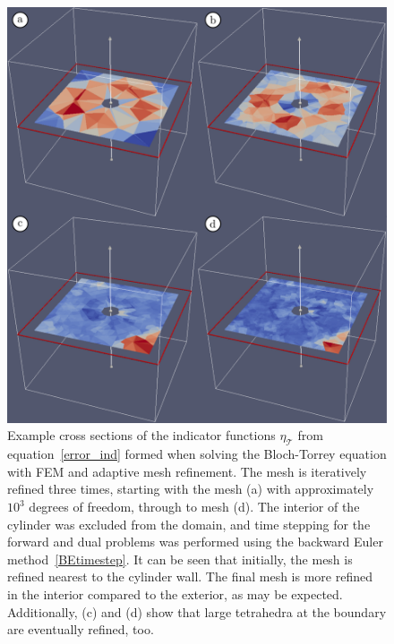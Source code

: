 \documentclass[twocolumn,twoside]{article}
\begin{document}
\clearpage
\begin{figure}[H]
\centering
\begin{minipage}{1.0\textwidth}
    \centering
    \includegraphics[keepaspectratio=true,width=1.0\textwidth]{figures/hollow_adaptive_combined_iters}
    \caption{Example cross sections of the indicator functions $\eta_\mathcal{T}$ from equation~\eqref{error_ind} formed when solving the Bloch-Torrey equation with FEM and adaptive mesh refinement.
    The mesh is iteratively refined three times, starting with the mesh (a) with approximately $10^3$ degrees of freedom, through to mesh (d).
    The interior of the cylinder was excluded from the domain, and time stepping for the forward and dual problems was performed using the backward Euler method~\eqref{BEtimestep}.
    It can be seen that initially, the mesh is refined nearest to the cylinder wall.
    The final mesh is more refined in the interior compared to the exterior, as may be expected.
    Additionally, (c) and (d) show that large tetrahedra at the boundary are eventually refined, too.}
    \label{fig:hollow_adaptive_combined_iters}
\end{minipage}
\end{figure}
\end{document}
